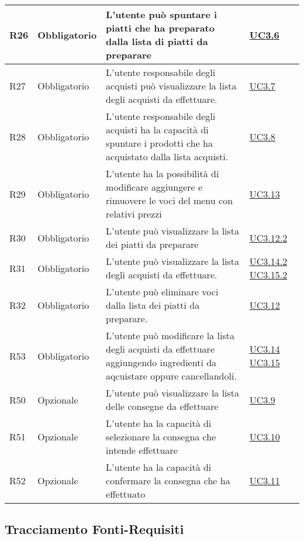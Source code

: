 \begin{longtable}{|P{1.5cm}|P{3cm}|P{6cm}|P{2.5cm}|}
	\hline R26 & Obbligatorio & L’utente  può spuntare i piatti che ha preparato dalla lista di piatti da preparare  & \hyperref[UC3.6]{UC3.6} \\
	\hline R27 & Obbligatorio & L’utente responsabile degli acquisti può visualizzare la lista degli acquisti da effettuare. & \hyperref[UC3.7]{UC3.7} \\
	\hline R28 & Obbligatorio & L’utente responsabile degli acquisti ha la capacità di spuntare i prodotti che ha acquistato dalla lista acquisti.
	 & \hyperref[UC3.8]{UC3.8} \\
	\hline R29 & Obbligatorio & L’utente  ha la possibilità di modificare aggiungere e rimuovere le voci del menu con relativi prezzi & \hyperref[UC3.13]{UC3.13} \\
	\hline R30 & Obbligatorio & L’utente  può visualizzare la lista dei piatti da preparare & \hyperref[UC3.12.2]{UC3.12.2} \\
	\hline R31 & Obbligatorio & L’utente  può visualizzare la lista degli acquisti da effettuare. & \hyperref[UC3.14.2]{UC3.14.2} \hyperref[UC3.15.2]{UC3.15.2} \\
	\hline R32 & Obbligatorio & L’utente  può eliminare voci dalla lista dei piatti da preparare. & \hyperref[UC3.12]{UC3.12} \\
	\hline R53 & Obbligatorio & L’utente  può modificare la lista degli acquisti da effettuare aggiungendo ingredienti da aqcuistare oppure cancellandoli.
	 & \hyperref[UC3.14]{UC3.14} \linebreak \hyperref[UC3.15]{UC3.15} \\	 
	\hline R50 & Opzionale & L’utente  può visualizzare la lista delle consegne da effettuare & \hyperref[UC3.9]{UC3.9} \\
	\hline R51 & Opzionale & L’utente  ha la capacità di selezionare la consegna che intende effettuare & \hyperref[UC3.10]{UC3.10} \\
	\hline R52 & Opzionale & L’utente  ha la capacità di confermare la consegna che ha effettuato & \hyperref[UC3.11]{UC3.11} \\
	\hline
\end{longtable}

\subsection{Tracciamento Fonti-Requisiti}

